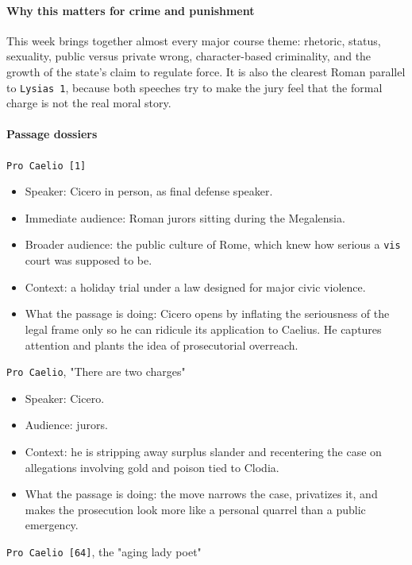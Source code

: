 \documentclass[11pt]{article}
\begin{document}
\paragraph{Why this matters for crime and punishment}

This week brings together almost every major course theme: rhetoric, status, sexuality, public versus private wrong, character-based criminality, and the growth of the state's claim to regulate force. It is also the clearest Roman parallel to \texttt{Lysias 1}, because both speeches try to make the jury feel that the formal charge is not the real moral story.

\paragraph{Passage dossiers}

\texttt{Pro Caelio [1]}

\begin{itemize}
\item Speaker: Cicero in person, as final defense speaker.
\item Immediate audience: Roman jurors sitting during the Megalensia.
\item Broader audience: the public culture of Rome, which knew how serious a \texttt{vis} court was supposed to be.
\item Context: a holiday trial under a law designed for major civic violence.
\item What the passage is doing: Cicero opens by inflating the seriousness of the legal frame only so he can ridicule its application to Caelius. He captures attention and plants the idea of prosecutorial overreach.
\end{itemize}

\texttt{Pro Caelio}, "There are two charges"

\begin{itemize}
\item Speaker: Cicero.
\item Audience: jurors.
\item Context: he is stripping away surplus slander and recentering the case on allegations involving gold and poison tied to Clodia.
\item What the passage is doing: the move narrows the case, privatizes it, and makes the prosecution look more like a personal quarrel than a public emergency.
\end{itemize}

\texttt{Pro Caelio [64]}, the "aging lady poet"
\end{document}
